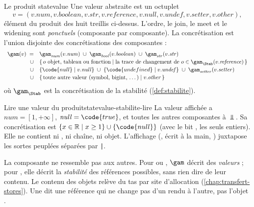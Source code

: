 \begin{definition}{Le produit }{statevalue}
  Une valeur abstraite est un octuplet
  \[
  v = (v.\mathit{num}, v.\mathit{boolean}, v.\mathit{str},
  v.\mathit{reference}, v.\mathit{null}, v.\mathit{undef},
  v.\mathit{setter}, v.\mathit{other}),
  \]
  élément du produit des huit treillis ci-dessus. L'ordre, le join, le meet et le widening sont
  \emph{ponctuels} (composante par composante). La concrétisation est
  l'union disjointe des concrétisations des composantes :
  \[
  \begin{array}{rl}
    \gam(v) \;=& \gam_{\mathit{num}}(v.\mathit{num}) \;\cup\;
                 \gam_{\mathit{bool}}(v.\mathit{boolean}) \;\cup\;
                 \gam_{\mathit{str}}(v.\mathit{str})\\[2pt]
       \cup& \{\, o \text{ objet, tableau ou fonction} \mid
                 \text{la trace de changement de } o \in
                 \gam_{\Stab}(v.\mathit{reference}) \,\}\\[2pt]
       \cup& \{\code{null} \mid v.\mathit{null}\} \;\cup\;
                 \{\code{undefined} \mid v.\mathit{undef}\} \;\cup\;
                 \gam_{\mathit{setter}}(v.\mathit{setter})\\[2pt]
       \cup& \{\, \text{toute autre valeur (symbol, bigint, \dots)} \mid
                 v.\mathit{other} \,\}
  \end{array}
  \]
  où $\gam_{\Stab}$ est la concrétisation de la stabilité
  (\cref{def:stabilite}).
\end{definition}

\begin{exemple}{Lire une valeur du produit}{statevalue-stabilite-lire}
  La valeur affichée  a
  $\mathit{num} = [1, +\infty]$, $\mathit{null} = \code{true}$, et toutes
  les autres composantes à $\Bot$. Sa concrétisation est
  $\{x \in \mathbb{R} \mid x \ge 1\} \cup \{\code{null}\}$ (avec le bit
  , les seuls entiers). Elle ne contient ni , ni
  chaîne, ni objet. L'affichage (, écrit à la main,
  ) juxtapose les sortes
  peuplées séparées par \texttt{|}.
\end{exemple}

\begin{piege}
  La composante  ne ressemble pas aux autres. Pour
   ou , $\gam$ décrit des \emph{valeurs} ; pour
  , elle décrit la \emph{stabilité} des références possibles,
  sans rien dire de leur contenu. Le contenu des objets relève du tas par
  site d'allocation (\cref{chap:transfert-stores}). Une 
   dit \og une référence qui ne change pas d'un rendu à
  l'autre\fg{}, pas \og l'objet \fg{}.
\end{piege}


